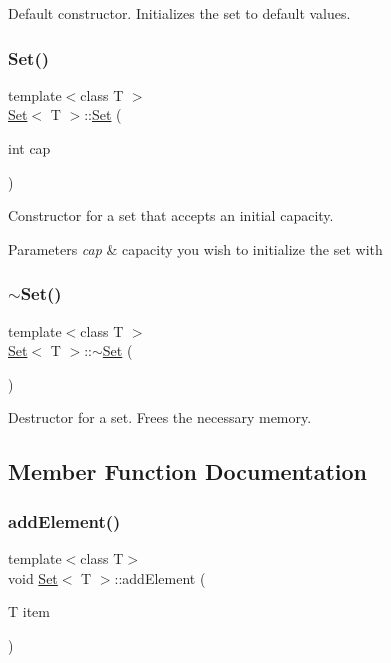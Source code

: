 Default constructor. Initializes the set to default values. \mbox{\label{class_set_a97a93684c0b9e5a9921c58ce30aded1c}} 
\subsubsection{\texorpdfstring{Set()}{Set()}\hspace{0.1cm}{\footnotesize\ttfamily [2/2]}}
{\footnotesize\ttfamily template$<$class T $>$ \\
\hyperlink{class_set}{Set}$<$ T $>$\+::\hyperlink{class_set}{Set} (\begin{DoxyParamCaption}\item[{int}]{cap }\end{DoxyParamCaption})}

Constructor for a set that accepts an initial capacity.


\begin{DoxyParams}{Parameters}
{\em cap} & capacity you wish to initialize the set with \\
\hline
\end{DoxyParams}
\mbox{\label{class_set_aaa4abcf9b94524173e55b7301c7009f4}} 
\subsubsection{\texorpdfstring{$\sim$\+Set()}{~Set()}}
{\footnotesize\ttfamily template$<$class T $>$ \\
\hyperlink{class_set}{Set}$<$ T $>$\+::$\sim$\hyperlink{class_set}{Set} (\begin{DoxyParamCaption}{ }\end{DoxyParamCaption})}

Destructor for a set. Frees the necessary memory. 

\subsection{Member Function Documentation}
\mbox{\label{class_set_ac96d9574533e25b2689bae916badfcd8}} 
\subsubsection{\texorpdfstring{add\+Element()}{addElement()}}
{\footnotesize\ttfamily template$<$class T$>$ \\
void \hyperlink{class_set}{Set}$<$ T $>$\+::add\+Element (\begin{DoxyParamCaption}\item[{T}]{item }\end{DoxyParamCaption})}

